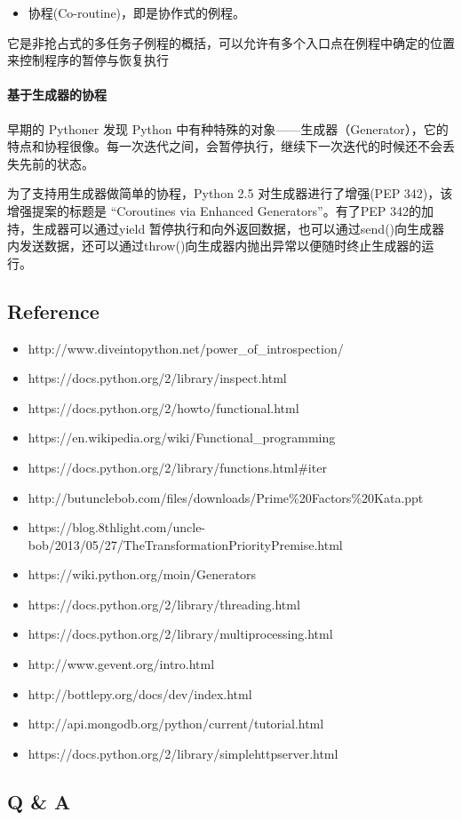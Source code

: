 \documentclass[11pt]{article}
\providecommand{\tightlist}{%
      \setlength{\itemsep}{0pt}\setlength{\parskip}{0pt}}
\begin{document}
\begin{itemize}
\tightlist
\item
  协程(Co-routine)，即是协作式的例程。
\end{itemize}

它是非抢占式的多任务子例程的概括，可以允许有多个入口点在例程中确定的位置来控制程序的暂停与恢复执行

    \hypertarget{ux57faux4e8eux751fux6210ux5668ux7684ux534fux7a0b}{%
\paragraph{基于生成器的协程}\label{ux57faux4e8eux751fux6210ux5668ux7684ux534fux7a0b}}

早期的 Pythoner 发现 Python
中有种特殊的对象------生成器（Generator），它的特点和协程很像。每一次迭代之间，会暂停执行，继续下一次迭代的时候还不会丢失先前的状态。

为了支持用生成器做简单的协程，Python 2.5 对生成器进行了增强(PEP
342)，该增强提案的标题是 ``Coroutines via Enhanced Generators''。有了PEP
342的加持，生成器可以通过yield
暂停执行和向外返回数据，也可以通过send()向生成器内发送数据，还可以通过throw()向生成器内抛出异常以便随时终止生成器的运行。

    \hypertarget{reference}{%
\subsection{Reference}\label{reference}}

\begin{itemize}
\tightlist
\item
  http://www.diveintopython.net/power\_of\_introspection/
\item
  https://docs.python.org/2/library/inspect.html
\item
  https://docs.python.org/2/howto/functional.html
\item
  https://en.wikipedia.org/wiki/Functional\_programming
\item
  https://docs.python.org/2/library/functions.html\#iter
\item
  http://butunclebob.com/files/downloads/Prime\%20Factors\%20Kata.ppt
\item
  https://blog.8thlight.com/uncle-bob/2013/05/27/TheTransformationPriorityPremise.html
\item
  https://wiki.python.org/moin/Generators
\item
  https://docs.python.org/2/library/threading.html
\item
  https://docs.python.org/2/library/multiprocessing.html
\item
  http://www.gevent.org/intro.html
\item
  http://bottlepy.org/docs/dev/index.html
\item
  http://api.mongodb.org/python/current/tutorial.html
\item
  https://docs.python.org/2/library/simplehttpserver.html
\end{itemize}

    \hypertarget{q-a}{%
\subsection{Q \& A}\label{q-a}}


    
    
    
    
\end{document}
